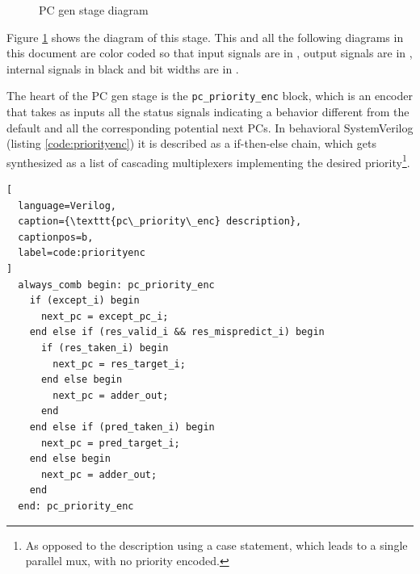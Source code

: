 \begin{figure}[hbt]
  \centering
  \caption{\acs{PC} gen stage diagram}
  \label{fig:pc_gen_stage}
\end{figure}
Figure \ref{fig:pc_gen_stage} shows the diagram of this stage. This and all the following diagrams in this document are color coded so that input signals are in {\color{input_blue}{blue}}, output signals are in {\color{output_red}{red}}, internal signals in black and bit widths are in {\color{width_gray}{gray}}.

The heart of the \ac{PC} gen stage is the \texttt{pc\_priority\_enc} block, which is an encoder that takes as inputs all the status signals indicating a behavior different from the default and all the corresponding potential next \acp{PC}. In behavioral SystemVerilog (listing \ref{code:priorityenc}) it is described as a if-then-else chain, which gets synthesized as a list of cascading multiplexers implementing the desired priority\footnote{As opposed to the description using a case statement, which leads to a single parallel mux, with no priority encoded.}.
\begin{lstlisting}[
  language=Verilog,
  caption={\texttt{pc\_priority\_enc} description},
  captionpos=b,
  label=code:priorityenc
]
  always_comb begin: pc_priority_enc
    if (except_i) begin
      next_pc = except_pc_i;
    end else if (res_valid_i && res_mispredict_i) begin
      if (res_taken_i) begin
        next_pc = res_target_i;
      end else begin
        next_pc = adder_out;
      end
    end else if (pred_taken_i) begin
      next_pc = pred_target_i;
    end else begin
      next_pc = adder_out;
    end
  end: pc_priority_enc
\end{lstlisting}

